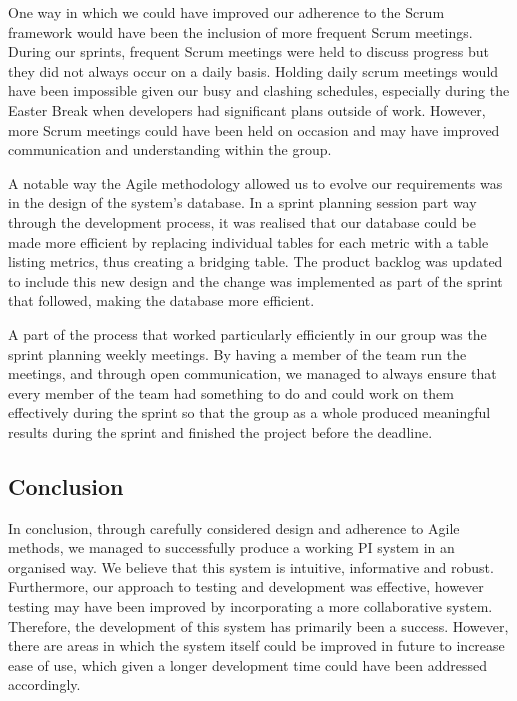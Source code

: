 \documentclass[12pt]{article}
\begin{document}
One way in which we could have improved our adherence to the Scrum framework 
would have been the inclusion of more frequent Scrum meetings. During our 
sprints, frequent Scrum meetings were held to discuss progress but they did 
not always occur on a daily basis. Holding daily scrum meetings would have 
been impossible given our busy and clashing schedules, especially during 
the Easter Break when developers had significant plans outside of work. 
However, more Scrum meetings could have been held on occasion and may have 
improved communication and understanding within the group.\par

A notable way the Agile methodology allowed us to evolve our requirements 
was in the design of the system's database. In a sprint planning session 
part way through the development process, it was realised that our database 
could be made more efficient by replacing individual tables for each metric 
with a table listing metrics, thus creating a bridging table. The product 
backlog was updated to include this new design and the change was implemented 
as part of the sprint that followed, making the database more efficient.\par

A part of the process that worked particularly efficiently in our group was 
the sprint planning weekly meetings. By having a member of the team run the 
meetings, and through open communication, we managed to always ensure that 
every member of the team had something to do and could work on them 
effectively during the sprint so that the group as a whole produced 
meaningful results during the sprint and finished the project before 
the deadline.\par

\subsection{Conclusion}
In conclusion, through carefully considered design and adherence to Agile 
methods, we managed to successfully produce a working PI system in an 
organised way. We believe that this system is intuitive, informative and 
robust. Furthermore, our approach to testing and development was 
effective, however testing may have been improved by incorporating a more collaborative system. Therefore, the development of this system has primarily been a 
success. However, there are areas in which the system itself could be 
improved in future to increase ease of use, which given a longer development time could have been addressed accordingly.\par
\end{document}
